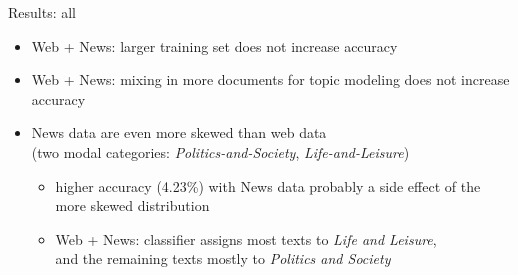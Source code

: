 \documentclass{beamer}
\begin{document}
\begin{frame}
  {Results: all}
  \centering

\vspace{.5cm}

  \begin{itemize}
    \item \alert{Web + News}: larger training set does not increase accuracy
    \item \alert{Web + News}: mixing in more documents for topic modeling does not increase accuracy
    \item \alert{News} data are even more skewed than web data\\ (two modal categories: \textit{Politics-and-Society}, \textit{Life-and-Leisure})
      \begin{itemize}
        \item higher accuracy (4.23\%) with \alert{News} data probably a side effect of the more skewed distribution
        \item \alert{Web + News}: classifier assigns most texts to \textit{Life and Leisure},\\ and the remaining texts mostly to \textit{Politics and Society}
      \end{itemize}
  \end{itemize}
\end{frame}
\end{document}
